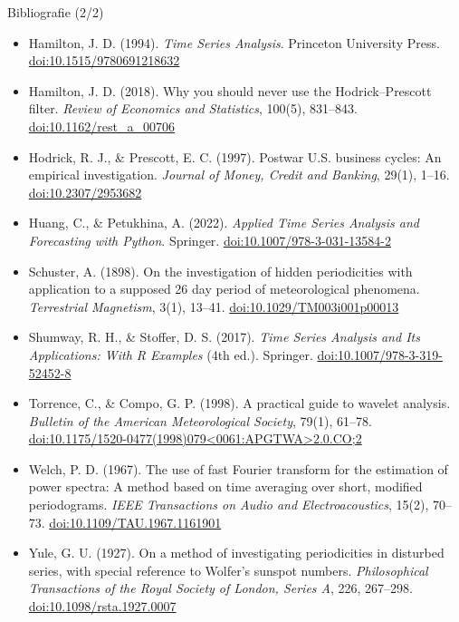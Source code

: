 \begin{frame}{Bibliografie (2/2)}
\itemsize{\scriptsize}
\begin{itemize}
    \item Hamilton, J. D. (1994). \textit{Time Series Analysis}. Princeton University Press. \href{https://doi.org/10.1515/9780691218632}{doi:10.1515/9780691218632}
    \item Hamilton, J. D. (2018). Why you should never use the Hodrick--Prescott filter. \textit{Review of Economics and Statistics}, 100(5), 831--843. \href{https://doi.org/10.1162/rest_a_00706}{doi:10.1162/rest\_a\_00706}
    \item Hodrick, R. J., \& Prescott, E. C. (1997). Postwar U.S. business cycles: An empirical investigation. \textit{Journal of Money, Credit and Banking}, 29(1), 1--16. \href{https://doi.org/10.2307/2953682}{doi:10.2307/2953682}
    \item Huang, C., \& Petukhina, A. (2022). \textit{Applied Time Series Analysis and Forecasting with Python}. Springer. \href{https://doi.org/10.1007/978-3-031-13584-2}{doi:10.1007/978-3-031-13584-2}
    \item Schuster, A. (1898). On the investigation of hidden periodicities with application to a supposed 26 day period of meteorological phenomena. \textit{Terrestrial Magnetism}, 3(1), 13--41. \href{https://doi.org/10.1029/TM003i001p00013}{doi:10.1029/TM003i001p00013}
    \item Shumway, R. H., \& Stoffer, D. S. (2017). \textit{Time Series Analysis and Its Applications: With R Examples} (4th ed.). Springer. \href{https://doi.org/10.1007/978-3-319-52452-8}{doi:10.1007/978-3-319-52452-8}
    \item Torrence, C., \& Compo, G. P. (1998). A practical guide to wavelet analysis. \textit{Bulletin of the American Meteorological Society}, 79(1), 61--78. \href{https://doi.org/10.1175/1520-0477(1998)079<0061:APGTWA>2.0.CO;2}{doi:10.1175/1520-0477(1998)079<0061:APGTWA>2.0.CO;2}
    \item Welch, P. D. (1967). The use of fast Fourier transform for the estimation of power spectra: A method based on time averaging over short, modified periodograms. \textit{IEEE Transactions on Audio and Electroacoustics}, 15(2), 70--73. \href{https://doi.org/10.1109/TAU.1967.1161901}{doi:10.1109/TAU.1967.1161901}
    \item Yule, G. U. (1927). On a method of investigating periodicities in disturbed series, with special reference to Wolfer's sunspot numbers. \textit{Philosophical Transactions of the Royal Society of London, Series A}, 226, 267--298. \href{https://doi.org/10.1098/rsta.1927.0007}{doi:10.1098/rsta.1927.0007}
\end{itemize}
\end{frame}


